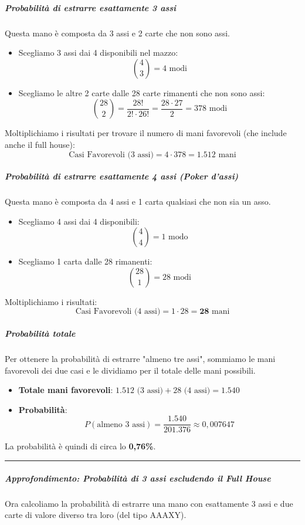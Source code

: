 \begin{esempio}
\subparagraph{Probabilità di estrarre esattamente 3 assi}
Questa mano è composta da 3 assi e 2 carte che non sono assi.
\begin{itemize}
    \item Scegliamo 3 assi dai 4 disponibili nel mazzo:
    \[ \binom{4}{3} = 4 \text{ modi} \]
    \item Scegliamo le altre 2 carte dalle 28 carte rimanenti che non sono assi:
    \[ \binom{28}{2} = \frac{28!}{2! \cdot 26!} = \frac{28 \cdot 27}{2} = 378 \text{ modi} \]
\end{itemize}
Moltiplichiamo i risultati per trovare il numero di mani favorevoli (che include anche il full house):
\[ \text{Casi Favorevoli (3 assi)} = 4 \cdot 378 = \mathbf{1.512} \text{ mani} \]

\subparagraph{Probabilità di estrarre esattamente 4 assi (Poker d'assi)}
Questa mano è composta da 4 assi e 1 carta qualsiasi che non sia un asso.
\begin{itemize}
    \item Scegliamo 4 assi dai 4 disponibili:
    \[ \binom{4}{4} = 1 \text{ modo} \]
    \item Scegliamo 1 carta dalle 28 rimanenti:
    \[ \binom{28}{1} = 28 \text{ modi} \]
\end{itemize}
Moltiplichiamo i risultati:
\[ \text{Casi Favorevoli (4 assi)} = 1 \cdot 28 = \mathbf{28} \text{ mani} \]

\subparagraph{Probabilità totale}
Per ottenere la probabilità di estrarre "almeno tre assi", sommiamo le mani favorevoli dei due casi e le dividiamo per il totale delle mani possibili.
\begin{itemize}
    \item \textbf{Totale mani favorevoli}: $1.512 \text{ (3 assi)} + 28 \text{ (4 assi)} = \mathbf{1.540}$
    \item \textbf{Probabilità}: 
    \[ P(\text{almeno 3 assi}) = \frac{1.540}{201.376} \approx 0,007647 \]
\end{itemize}
La probabilità è quindi di circa lo \textbf{0,76\%}.

\vspace{1cm} %

\hrule %

\vspace{1cm}

\subparagraph{Approfondimento: Probabilità di 3 assi escludendo il Full House}
Ora calcoliamo la probabilità di estrarre una mano con esattamente 3 assi e due carte di valore diverso tra loro (del tipo AAAXY).


\end{esempio}
